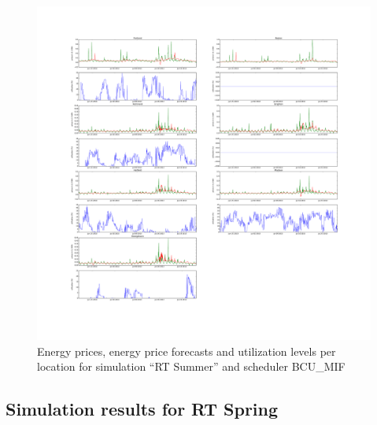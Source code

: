 \begin{figure}[htbp]
	\centering
	\vspace*{-0.6in}
	\hspace*{-1.4in}
		\includegraphics[width=1.60\textwidth]{figures/appendix_simulation_results/RT_Summer_scenario_7.pdf}
	\vspace*{-1.0in}
	\caption{Energy prices, energy price forecasts and utilization levels per location for simulation ``RT Summer'' and scheduler BCU\_MIF}
	\label{fig:app_RT_Summer_scenario_7}
\end{figure}


\FloatBarrier
\subsection{Simulation results for RT Spring}

